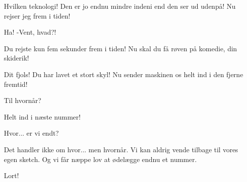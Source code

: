 \documentclass[a4paper,11pt]{article}
\begin{document}
\begin{sketch}

 Hvilken teknologi!  Den er jo endnu mindre indeni end den
ser ud udenpå!  Nu rejser jeg frem i tiden!


 Ha! -Vent, hvad?!

 Du rejste kun fem sekunder frem i tiden!  Nu skal du få røven
på komedie, din skiderik!


 Dit fjols!  Du har lavet et stort skyl!  Nu sender maskinen os
helt ind i den fjerne fremtid!

 Til hvornår?

 Helt ind i næste nummer!




 Hvor... er vi endt?

 Det handler ikke om hvor... men hvornår.  Vi kan aldrig vende
tilbage til vores egen sketch.  Og vi får næppe lov at ødelægge endnu et nummer.

 Lort!


\end{sketch}
\end{document}
